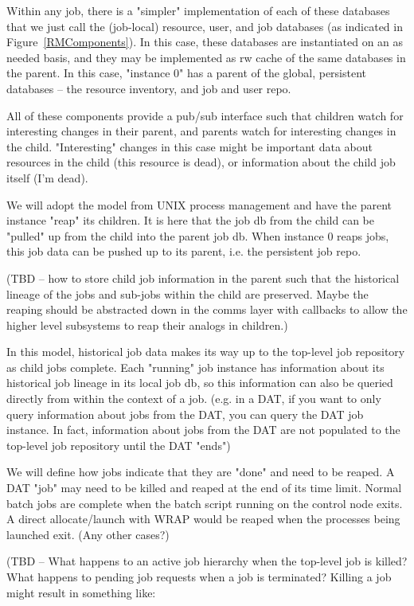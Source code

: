 Within any job, there is a "simpler" implementation of each of these
databases that we just call the (job-local) resource, user, and job
databases (as indicated in Figure~\ref{RMComponents}).  In this case,
these databases are instantiated on an as needed basis, and they may
be implemented as rw cache of the same databases in the parent. In
this case, "instance 0" has a parent of the global, persistent
databases -- the resource inventory, and job and user repo.

All of these components provide a pub/sub interface such that children
watch for interesting changes in their parent, and parents watch for
interesting changes in the child. "Interesting" changes in this case
might be important data about resources in the child (this resource is
dead), or information about the child job itself (I'm dead).

We will adopt the model from UNIX process management and have the
parent instance "reap" its children. It is here that the job db from
the child can be "pulled" up from the child into the parent job db.
When instance 0 reaps jobs, this job data can be pushed up to its
parent, i.e. the persistent job repo.

(TBD -- how to store child job information in the parent such that the
historical lineage of the jobs and sub-jobs within the child are
preserved.  Maybe the reaping should be abstracted down in the comms
layer with callbacks to allow the higher level subsystems to reap
their analogs in children.)

In this model, historical job data makes its way up to the top-level
job repository as child jobs complete. Each "running" job instance has
information about its historical job lineage in its local job db, so
this information can also be queried directly from within the context
of a job. (e.g. in a DAT, if you want to only query information about
jobs from the DAT, you can query the DAT job instance. In fact,
information about jobs from the DAT are not populated to the top-level
job repository until the DAT "ends")

We will define how jobs indicate that they are "done" and need to be
reaped. A DAT "job" may need to be killed and reaped at the end of its
time limit. Normal batch jobs are complete when the batch script
running on the control node exits. A direct allocate/launch with WRAP
would be reaped when the processes being launched exit. (Any other
cases?)

(TBD -- What happens to an active job hierarchy when the top-level job
is killed?  What happens to pending job requests when a job is
terminated?  Killing a job might result in something like:

